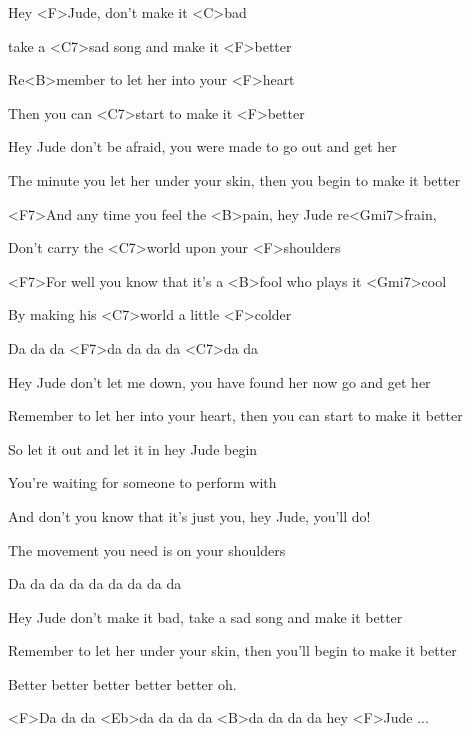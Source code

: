 

\zs
Hey <F>Jude, don't make it <C>bad

take a <C7>sad song and make it <F>better

Re<B>member to let her into your <F>heart

Then you can <C7>start to make it <F>better
\ks

\zs
Hey Jude don't be afraid,
you were made to go out and get her

The minute you let her under your skin,
then you begin to make it better
\ks

\zr
<F7>And any time you feel the <B>pain, hey {Jude} re<Gmi7>frain,

Don't {carry} the <C7>world {upon} your <F>shoulders

<F7>For well you know that it's a <B>fool who {plays} it <Gmi7>cool

By {making} his <C7>world a {little} <F>colder

Da da da <F7>da da da da <C7>da da
\kr

\zs
Hey Jude don't let me down,
you have found her now go and get her

Remember to let her into your heart,
then you can start to make it better
\ks

\zr
So let it out and let it in hey Jude begin

You're waiting for someone to perform with

And don't you know that it's just you, hey Jude, you'll do!

The movement you need is on your shoulders

Da da da da da da da da da
\kr

\zs
Hey Jude don't make it bad,
take a sad song and make it better

Remember to let her under your skin,
then you'll begin to make it better

Better better better better better oh.
\ks

<F>Da da da <Eb>da da da da <B>da da da da hey <F>Jude ...

\kp





